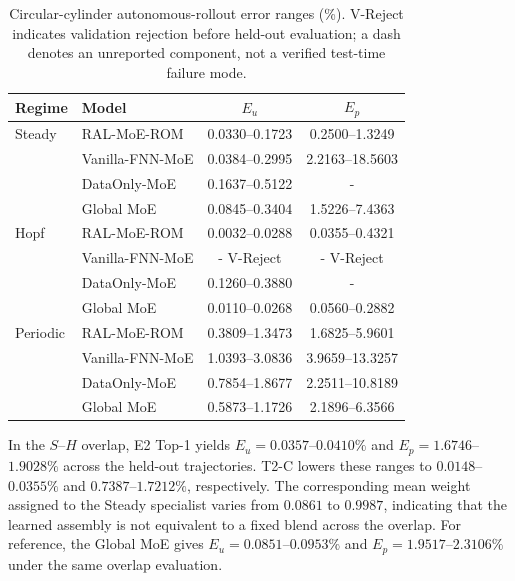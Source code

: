 \documentclass{article}
\providecommand{\DIFaddtex}[1]{{\protect\color{blue} \sf #1}} %
\providecommand{\DIFdeltex}[1]{{\protect\color{red} \scriptsize #1}} %
\providecommand{\DIFaddFL}[1]{\DIFadd{#1}} %
\providecommand{\DIFdelFL}[1]{\DIFdel{#1}} %
\providecommand{\DIFaddbeginFL}{} %
\providecommand{\DIFaddendFL}{} %
\providecommand{\DIFdelbeginFL}{} %
\providecommand{\DIFdelendFL}{} %
\providecommand{\DIFadd}[1]{\texorpdfstring{\DIFaddtex{#1}}{#1}} %
\providecommand{\DIFdel}[1]{\texorpdfstring{\DIFdeltex{#1}}{}} %
\providecommand{\DIFscaledelfig}{0.5}
\newlength{\DIFdelgraphicswidth} %
\newlength{\DIFdelgraphicsheight} %
\providecommand{\DIFaddincludegraphics}[2][]{{\color{blue}\fbox{\DIFOincludegraphics[#1]{#2}}}} %
\providecommand{\DIFdelincludegraphics}[2][]{%
\sbox{\DIFdelgraphicsbox}{\DIFOincludegraphics[#1]{#2}}%
\settoboxwidth{\DIFdelgraphicswidth}{\DIFdelgraphicsbox} %
\settoboxtotalheight{\DIFdelgraphicsheight}{\DIFdelgraphicsbox} %
\scalebox{\DIFscaledelfig}{%
\parbox[b]{\DIFdelgraphicswidth}{\usebox{\DIFdelgraphicsbox}\\[-\baselineskip] \rule{\DIFdelgraphicswidth}{0em}}\llap{\resizebox{\DIFdelgraphicswidth}{\DIFdelgraphicsheight}{%
\setlength{\unitlength}{\DIFdelgraphicswidth}%
\begin{picture}(1,1)%
\thicklines\linethickness{2pt} %
{\color[rgb]{1,0,0}\put(0,0){\framebox(1,1){}}}%
{\color[rgb]{1,0,0}\put(0,0){\line( 1,1){1}}}%
{\color[rgb]{1,0,0}\put(0,1){\line(1,-1){1}}}%
\end{picture}%
}\hspace*{3pt}}} %
} %
\DeclareRobustCommand{\DIFaddbeginFL}{\DIFOaddbeginFL \let\includegraphics\DIFaddincludegraphics} %
\DeclareRobustCommand{\DIFaddendFL}{\DIFOaddendFL \let\includegraphics\DIFOincludegraphics} %
\DeclareRobustCommand{\DIFdelbeginFL}{\DIFOdelbeginFL \let\includegraphics\DIFdelincludegraphics} %
\DeclareRobustCommand{\DIFdelendFL}{\DIFOaddendFL \let\includegraphics\DIFOincludegraphics} %
\begin{document}
\par
\begin{table}[H]
\centering
\caption{Circular-cylinder autonomous-rollout error ranges (\%). \DIFaddbeginFL \DIFaddFL{V-Reject indicates validation rejection before held-out evaluation; a dash denotes an unreported component, not a verified test-time failure mode.}\DIFaddendFL }
\label{tab:circular_full}
\small
\setlength{\tabcolsep}{4pt}
\begin{tabular}{llcc}
\toprule
Regime & Model & $E_u$ & $E_p$ \\
\midrule
Steady & RAL-MoE-ROM & 0.0330--0.1723 & 0.2500--1.3249 \\
 & Vanilla-FNN-MoE & 0.0384--0.2995 & 2.2163--18.5603 \\
 & DataOnly-MoE & 0.1637--0.5122 & - \\
 & Global MoE & 0.0845--0.3404 & 1.5226--7.4363 \\
\midrule
Hopf & RAL-MoE-ROM & 0.0032--0.0288 & 0.0355--0.4321 \\
 & Vanilla-FNN-MoE & \DIFdelbeginFL \DIFdelFL{- }\DIFdelendFL \DIFaddbeginFL \DIFaddFL{V-Reject }\DIFaddendFL & \DIFdelbeginFL \DIFdelFL{-  }\DIFdelendFL \DIFaddbeginFL \DIFaddFL{V-Reject  }\DIFaddendFL \\
 & DataOnly-MoE & 0.1260--0.3880 & - \\
 & Global MoE & 0.0110--0.0268 & 0.0560--0.2882 \\
\midrule
Periodic & RAL-MoE-ROM & 0.3809--1.3473 & 1.6825--5.9601 \\
 & Vanilla-FNN-MoE & 1.0393--3.0836 & 3.9659--13.3257 \\
 & DataOnly-MoE & 0.7854--1.8677 & 2.2511--10.8189 \\
 & Global MoE & 0.5873--1.1726 & 2.1896--6.3566 \\
\bottomrule
\end{tabular}
\end{table}
\par

In the $S$--$H$ overlap, E2 Top-1 yields $E_u=0.0357$--$0.0410\%$ and
$E_p=1.6746$--$1.9028\%$ across the held-out trajectories. T2-C lowers these ranges to $0.0148$--$0.0355\%$ and $0.7387$--$1.7212\%$, respectively. The corresponding mean weight assigned to the Steady specialist varies from $0.0861$ to $0.9987$, indicating that the learned assembly is not equivalent to a fixed blend across the overlap. For reference, the Global MoE gives $E_u=0.0851$--$0.0953\%$ and $E_p=1.9517$--$2.3106\%$ under the same overlap evaluation.
\end{document}
